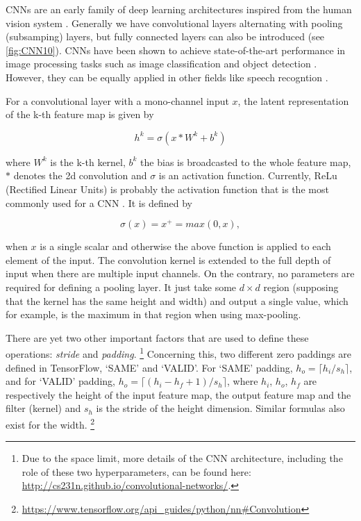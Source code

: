CNNs are an early family of deep learning
architectures inspired from the human vision system \cite{Y. LeCun 1998}.
Generally we have convolutional layers alternating with pooling
(subsamping) layers, but fully connected layers can also be introduced
(see \autoref{fig:CNN10}).
CNNs have been shown to achieve state-of-the-art performance in
image processing tasks such as image classification
\cite{A. Krizhevsky 2012} and object detection \cite{Y. LeCun 2010}.
However, they can be equally applied in other fields like speech recogntion
\cite{L. Deng 2013}.

For a convolutional layer with a mono-channel input $x$, the latent
representation of the k-th feature map is given by

\[h^k = \sigma(x\ast W^k + b^k)\]

where $W^k$ is the k-th kernel, $b^k$ the bias is broadcasted to the whole
feature map, $\ast$ denotes the 2d convolution and $\sigma$ is an
activation function.
Currently, ReLu (Rectified Linear Units) is probably the activation
function that is the most commonly used for a CNN \cite{A. Krizhevsky 2012}.
It is defined by

\[\sigma(x) = x^+ = max(0,x),\]

when $x$ is a single scalar and otherwise the above function is applied
to each element of the input.
The convolution kernel is extended to the full depth of input when there
are multiple input channels.
On the contrary, no parameters are required for defining a pooling layer.
It just take some $d \times d$ region (supposing that the kernel has the
same height and width) and output a single value, which for example,
is the maximum in that region when using max-pooling.

There are yet two other important factors that are used to define these
operations: \textit{stride} and \textit{padding}.%
\footnote{Due to the space limit, more details of the CNN architecture,
including the role of these two hyperparameters, can be found here:
\href{http://cs231n.github.io/convolutional-networks/}
{http://cs231n.github.io/convolutional-networks/}.}
Concerning this, two different zero paddings are defined in TensorFlow,
`SAME' and `VALID'. For `SAME' padding, $h_o = \lceil h_i/s_h \rceil$,
and for `VALID' padding, $h_o = \lceil (h_i-h_f+1)/s_h \rceil$,
where $h_i$, $h_o$, $h_f$ are respectively the height of the input
feature map, the output feature map and the filter (kernel) and
$s_h$ is the stride of the height
dimension. Similar formulas also exist for the width.%
\footnote{
\href{https://www.tensorflow.org/api\_guides/python/nn\#Convolution}
{https://www.tensorflow.org/api\_guides/python/nn\#Convolution}}

